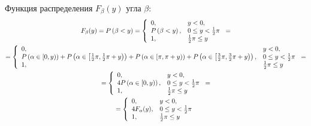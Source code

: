 \documentclass[12pt,a4paper]{article}
\begin{document}
    Функция распределения $F_\beta(y)$ угла $\beta$:
    \begin{multline}
        F_\beta(y) = P \left ( \beta < y \right )
        = \left \{
        \begin{array}{ll}
            0 ,                      & y < 0,                    \\
            P \left ( \beta < y \right ), & 0 \le y < \frac{1}{2} \pi \\
            1,                       & \frac{1}{2} \pi \leq y
        \end{array}
        \right . = \\
        = \left \{
        \begin{array}{ll}
            0 ,                                                                                                                                                                                                                                                                        & y < 0,                    \\
            P \left ( \alpha \in \left [ 0, y \right ) \right ) + P \left ( \alpha \in \left [ \frac{1}{2} \pi, \frac{1}{2} \pi + y \right ) \right ) + P \left ( \alpha \in \left [ \pi, \pi + y \right ) \right ) + P \left ( \alpha \in \left [ \frac{3}{2} \pi, \frac{3}{2} \pi + y \right ) \right ), & 0 \le y < \frac{1}{2} \pi \\
            1,                                                                                                                                                                                                                                                                         & \frac{1}{2} \pi \leq y
        \end{array}
        \right . = \\
        = \left \{
        \begin{array}{ll}
            0 ,                                               & y < 0,                    \\
            4 P \left ( \alpha \in \left [ 0, y \right ) \right ), & 0 \le y < \frac{1}{2} \pi \\
            1,                                                & \frac{1}{2} \pi \leq y
        \end{array}
        \right . = \\
        = \left \{
        \begin{array}{ll}
            0 ,            & y < 0,                    \\
            4 F_\alpha(y), & 0 \le y < \frac{1}{2} \pi \\
            1,             & \frac{1}{2} \pi \leq y
        \end{array}
        \right .
    \end{multline}
\end{document}
